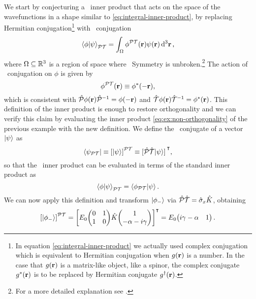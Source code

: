             We start by conjecturing \cite{bender2024} a \PT\ inner product that acts on the space of the wavefunctions in a shape similar to \eqref{eq:integral-inner-product}, by replacing Hermitian conjugation\footnote{In equation \eqref{eq:integral-inner-product} we actually used complex conjugation which is equivalent to Hermitian conjugation when $g\pqty{\vb{r}}$ is a number. In the case that $g\pqty{\vb{r}}$ is a matrix-like object, like a spinor, the complex conjugate $g^*\pqty{\vb{r}}$ is to be replaced by Hermitian conjugate $g^\dag\pqty{\vb{r}}$.} with \PT\ conjugation
            \begin{equation}
                \label{eq:PT-inner-product-integral}
                \braket{\phi}{\psi}_{\PT} = \int\nolimits_{\Omega} \phi^{\PT}\pqty{\vb{r}} \psi\pqty{\vb{r}} \dd[3]{\vb{r}}
                \mycomma
            \end{equation}
            where $\Omega\subseteq\mathbb{R}^3$ is a region of space where \PT\ Symmetry is unbroken.\footnote{For a more detailed explanation see .} The action of \PT\ conjugation on $\phi$ is given by
            \begin{equation*}
                \phi^{\PT}\pqty{\vb{r}} \equiv \phi^*\pqty{-\vb{r}}
                \mycomma
            \end{equation*}
            which is consistent with $\hP \phi\pqty{\vb{r}} \hP^{-1} = \phi\pqty{{-\vb{r}}}$ and $\hT \phi\pqty{\vb{r}} \hT^{-1} = \phi^*\pqty{{\vb{r}}}$. This definition of the inner product is enough to restore orthogonality and we can verify this claim by evaluating the inner product \eqref{eq:ex:non-orthogonality} of the previous example with the new definition. We define the \PT\ conjugate of a vector $\ket{\psi}$ as
            \begin{equation}
                \bra{\psi_{\PT}}
                \equiv \bqty{\ket{\psi}}^{\PT}
                \equiv \bqty*{\hP\hT\!\ket{\psi}}^\intercal
                \mycomma
            \end{equation}
            so that the \PT\ inner product can be evaluated in terms of the standard inner product as 
            \begin{equation}
                \label{eq:pt-conjugation}
                \braket{\phi}{\psi}_{\mathcal{P}\mathcal{T}} = \braket{\phi_{\mathcal{P}\mathcal{T}}}{\psi}
                \text{.}
            \end{equation}
            We can now apply this definition and transform $\ket{\phi_-}$ via $\mathcal{\hat{P}}\mathcal{\hat{T}} = \hat{\sigma}_x \hat{K}$, obtaining
            \begin{equation*}
                \bqty{\ket{\phi_-}}^{\PT}
                = \bqty{E_0\! \pmqty{\admat[0]{1,1}}\! \hK\! \pmqty{1 \\ -\alpha - i \gamma }}^\intercal
                = E_0\! \pmqty{i \gamma - \alpha & 1}
                \myperiod
            \end{equation*}

